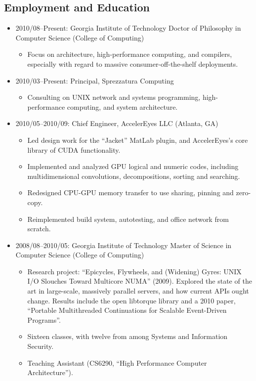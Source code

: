 \documentclass{article}
\newenvironment{tightitemize}
{\begin{itemize}
  \setlength{\itemsep}{1pt}
  \setlength{\parskip}{0pt}
  \setlength{\parsep}{0pt}}
{\end{itemize}}
\begin{document}
\subsection*{Employment and Education}
\begin{tightitemize}
\item 2010/08--Present: Georgia Institute of Technology
Doctor of Philosophy in Computer Science (College of Computing)

\begin{tightitemize}
\item Focus on architecture, high-performance computing, and compilers,
  especially with regard to massive consumer-off-the-shelf deployments.
\end{tightitemize}

\item 2010/03--Present: Principal, Sprezzatura Computing

\begin{tightitemize}
\item Consulting on UNIX network and systems programming, high-performance
  computing, and system architecture.
\end{tightitemize}

\item 2010/05--2010/09: Chief Engineer, AccelerEyes LLC (Atlanta, GA)
\begin{tightitemize}
\item Led design work for the ``Jacket'' MatLab plugin, and AccelerEyes's core library of CUDA functionality.
\item Implemented and analyzed GPU logical and numeric codes, including multidimensional convolutions, decompositions, sorting and searching.
\item Redesigned CPU-GPU memory transfer to use sharing, pinning and zero-copy.
\item Reimplemented build system, autotesting, and office network from scratch.
\end{tightitemize}

\item 2008/08--2010/05: Georgia Institute of Technology
Master of Science in Computer Science (College of Computing)

\begin{tightitemize}
\item Research project: ``Epicycles, Flywheels, and (Widening) Gyres: UNIX I/O
  Slouches Toward Multicore NUMA'' (2009). Explored the state of the art in
  large-scale, massively parallel servers, and how current APIs ought
  change. Results include the open libtorque library and a 2010 paper,
  ``Portable Multithreaded Continuations for Scalable Event-Driven Programs''.
\item Sixteen classes, with twelve from among Systems and Information Security.
\item Teaching Assistant (CS6290, ``High Performance Computer Architecture'').
\end{tightitemize}


\end{tightitemize}
\end{document}

